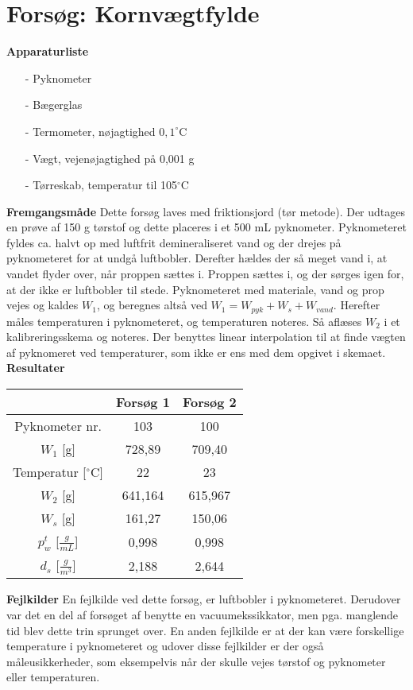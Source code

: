 \chapter{Forsøg: Kornvægtfylde}

\textbf{Apparaturliste}
\begin{itemize}
\item[-] Pyknometer
\item[-] Bægerglas
\item[-] Termometer, nøjagtighed $0,1^{\circ}$C
\item[-] Vægt, vejenøjagtighed på 0,001 g
\item[-] Tørreskab, temperatur til 105$^{\circ}$C
\end{itemize}

\textbf{Fremgangsmåde}
\newline
Dette forsøg laves med friktionsjord (tør metode). Der udtages en prøve af 150 g tørstof og dette placeres i et 500 mL pyknometer. Pyknometeret fyldes ca. halvt op med luftfrit demineraliseret vand og der drejes på pyknometeret for at undgå luftbobler. Derefter hældes der så meget vand i, at vandet flyder over, når proppen sættes i. Proppen sættes i, og der sørges igen for, at der ikke er luftbobler til stede. Pyknometeret med materiale, vand og prop vejes og kaldes $W_{1}$, og beregnes altså ved $W_1 = W_{pyk} + W_s + W_{vand}$. Herefter måles temperaturen i pyknometeret, og temperaturen noteres. Så aflæses $W_{2}$ i et kalibreringsskema og noteres. Der benyttes linear interpolation til at finde vægten af pyknomeret ved temperaturer, som ikke er ens med dem opgivet i skemaet. 
\newline
\newline
\textbf{Resultater}
\begin{center}
	\begin{tabular}{ |c|c|c| } 
		\hline
		 & Forsøg 1 & Forsøg 2 \\	\hline
		Pyknometer nr. & 103 & 100 \\	\hline
		$W_1$ [g] & 728,89 & 709,40 \\	\hline 
		Temperatur [$^{\circ}$C] & 22 & 23 \\ \hline
		$W_2$ [g] & 641,164 & 615,967 \\	\hline
		$W_s$ [g] & 161,27 & 150,06 \\	\hline
		$p_{w}^t$ [$\frac{g}{mL}$] & 0,998 & 0,998 \\	\hline
		$d_s$ [$\frac{g}{m^3}$] & 2,188 & 2,644	\\	\hline	
	\end{tabular}
\end{center}

\textbf{Fejlkilder}
\newline
En fejlkilde ved dette forsøg, er luftbobler i pyknometeret. Derudover var det en del af forsøget af benytte en vacuumekssikkator, men pga. manglende tid blev dette trin sprunget over. En anden fejlkilde er at der kan være forskellige temperature i pyknometeret og udover disse fejlkilder er der også måleusikkerheder, som eksempelvis når der skulle vejes tørstof og pyknometer eller temperaturen.